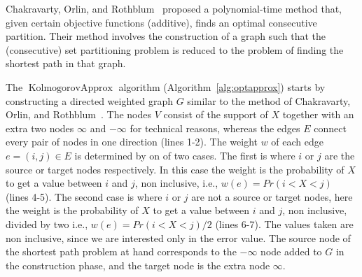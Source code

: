 \documentclass{article}
\DeclareMathOperator{\KlmApprox}{KolmogorovApprox}
\begin{document}
Chakravarty, Orlin, and Rothblum~\cite{chakravarty1982partitioning} proposed a polynomial-time method that, given certain objective functions (additive), finds an optimal consecutive partition. Their method involves the construction of a graph such that the (consecutive) set partitioning problem is reduced to the problem of finding the shortest path in that graph.

The $\KlmApprox$ algorithm (Algorithm~\ref{alg:optapprox}) starts by constructing a directed weighted graph $G$ similar to the method of Chakravarty, Orlin, and Rothblum~\cite{chakravarty1982partitioning}. The nodes $V$ consist of the support of $X$ together with an extra two nodes $\infty$ and $-\infty$ for technical reasons, whereas the edges $E$ connect every pair of nodes in one direction (lines 1-2). The weight $w$ of each edge $e=(i,j)\in E$ is determined by on of two cases. The first is where $i$ or $j$ are the source or target nodes respectively. In this case the weight is the probability of $X$ to get a value between $i$ and $j$, non inclusive, i.e., $w(e)=Pr(i<X<j)$ (lines 4-5). The second case is where $i$ or $j$ are not a source or target nodes, here the weight is the probability of $X$ to get a value between $i$ and $j$, non inclusive, divided by two i.e., $w(e)=Pr(i<X<j)/2$ (lines 6-7). The values taken are non inclusive, since we are interested only in the error value.
The source node of the shortest path problem at hand corresponds to the $-\infty$ node added to $G$ in the construction phase, and the target node is the extra node $\infty$.
\end{document}
